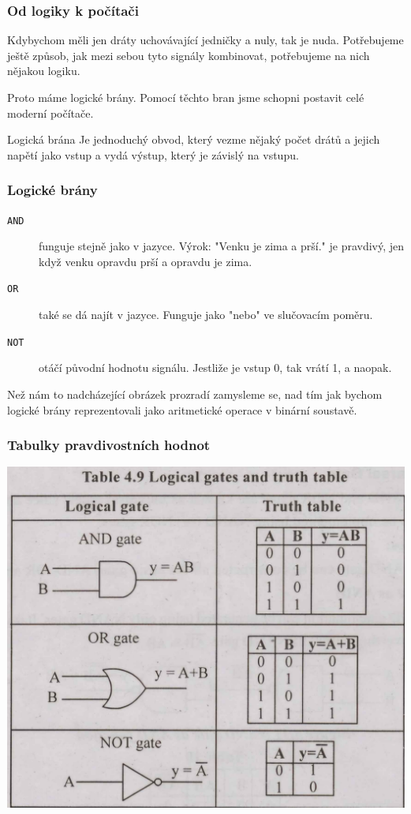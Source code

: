 \documentclass{beamer}
\begin{document}
\begin{frame}
	\frametitle{Od logiky k počítači}
	Kdybychom měli jen dráty uchovávající jedničky a nuly, tak je nuda. Potřebujeme
	ještě způsob, jak mezi sebou tyto signály kombinovat, potřebujeme na nich
	nějakou logiku.

	\vfill

	Proto máme logické brány. Pomocí těchto bran jsme schopni postavit celé moderní
	počítače.

	\vfill

	\begin{block}{Logická brána}
	 Je jednoduchý obvod, který vezme nějaký počet drátů a jejich napětí jako
	 vstup a vydá výstup, který je závislý na vstupu.
	\end{block}
\end{frame}

\begin{frame}
	\frametitle{Logické brány}
	\begin{description}
		\item[\texttt{AND}] funguje stejně jako v jazyce. Výrok: "Venku je zima a
		 prší." je pravdivý, jen když venku opravdu prší a opravdu je zima.
		\item[\texttt{OR}] také se dá najít v jazyce. Funguje jako "nebo" ve
		      slučovacím poměru.
		\item[\texttt{NOT}] otáčí původní hodnotu signálu. Jestliže je vstup 0, tak
		      vrátí 1, a naopak.
	\end{description}

	Než nám to nadcházející obrázek prozradí zamysleme se, nad tím jak bychom
	logické brány reprezentovali jako aritmetické operace v binární soustavě.
\end{frame}

\begin{frame}
	\frametitle{Tabulky pravdivostních hodnot}
	\includegraphics[scale=0.14]{gates.jpg}
\end{frame}
\end{document}
